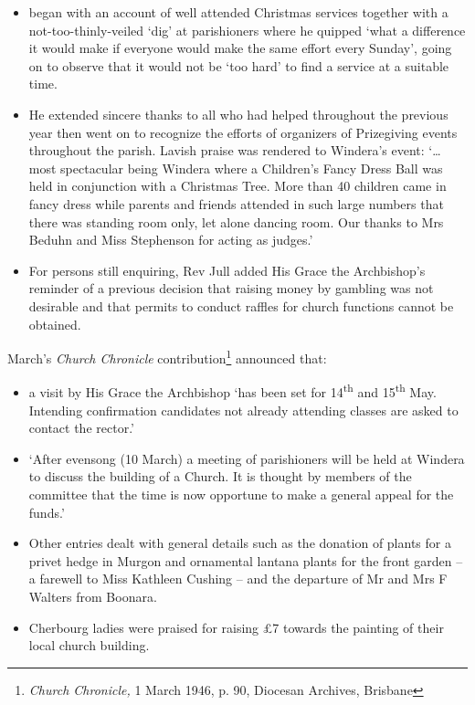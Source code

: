 \begin{itemize}
\item
  began with an account of well attended Christmas services together
  with a not-too-thinly-veiled `dig' at parishioners where he quipped
  `what a difference it would make if everyone would make the same
  effort every Sunday', going on to observe that it would not be `too
  hard' to find a service at a suitable time.
\item
  He extended sincere thanks to all who had helped throughout the
  previous year then went on to recognize the efforts of organizers of
  Prizegiving events throughout the parish. Lavish praise was rendered
  to Windera's event: `\ldots{} most spectacular being Windera where a
  Children's Fancy Dress Ball was held in conjunction with a Christmas
  Tree. More than 40 children came in fancy dress while parents and
  friends attended in such large numbers that there was standing room
  only, let alone dancing room. Our thanks to Mrs Beduhn and Miss
  Stephenson for acting as judges.'
\item
  For persons still enquiring, Rev Jull added His Grace the Archbishop's
  reminder of a previous decision that raising money by gambling was not
  desirable and that permits to conduct raffles for church functions
  cannot be obtained.
\end{itemize}

March's \emph{Church Chronicle} contribution\footnote{\emph{Church
  Chronicle,} 1 March 1946, p. 90, Diocesan Archives, Brisbane}
announced that:

\begin{itemize}
\item
  a visit by His Grace the Archbishop `has been set for
  14\textsuperscript{th} and 15\textsuperscript{th} May. Intending
  confirmation candidates not already attending classes are asked to
  contact the rector.'
\item
  `After evensong (10 March) a meeting of parishioners will be held at
  Windera to discuss the building of a Church. It is thought by members
  of the committee that the time is now opportune to make a general
  appeal for the funds.'
\item
  Other entries dealt with general details such as the donation of
  plants for a privet hedge in Murgon and ornamental lantana plants for
  the front garden -- a farewell to Miss Kathleen Cushing -- and the
  departure of Mr and Mrs F Walters from Boonara.
\item
  Cherbourg ladies were praised for raising \pounds7 towards the painting of
  their local church building.
\end{itemize}

